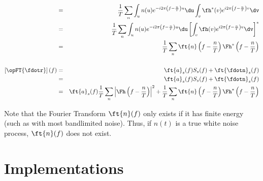 \begin{eqnarray*}
   \\&=& \frac{1}{T}\sum_n\int_u n(u) e^{-i2\pi\left(f-\frac{n}{T}\right)u}\du
                          \int_v \fh^\ast(v) e^{i2\pi\left(f-\frac{n}{T}\right)v}\dv
   \\&=& \frac{1}{T}\sum_n\int_u n(u) e^{-i2\pi\left(f-\frac{n}{T}\right)u}\du
                          \left[\int_v \fh(v) e^{i2\pi\left(f-\frac{n}{T}\right)v}\dv\right]^\ast
   \\&=& \frac{1}{T}\sum_n \ft{n}     \left(f-\frac{n}{T}\right) 
                           \Fh^\ast\left(f-\frac{n}{T}\right)
\\
\\
   \left[\opFT{\fdotr}\right](f)
     &=& \ft{a}_s(f) S_s(f) + \ft{\fdotn}_s(f)
   \\&=& \ft{a}_s(f) S_s(f) + \ft{\fdotn}_s(f)
   \\&=& \ft{a}_s(f) 
         \frac{1}{T} \sum_n \left|\Fh\left(f-\frac{n}{T}\right)\right|^2
         +\frac{1}{T}\sum_n \ft{n}     \left(f-\frac{n}{T}\right) 
                           \Fh^\ast\left(f-\frac{n}{T}\right)
\end{eqnarray*}

Note that the Fourier Transform $\ft{n}(f)$ only exists if it has finite energy 
(such as with most bandlimited noise). 
Thus, if $n(t)$ is a true white noise process,
$\ft{n}(f)$ does not exist.



\section{Implementations}
